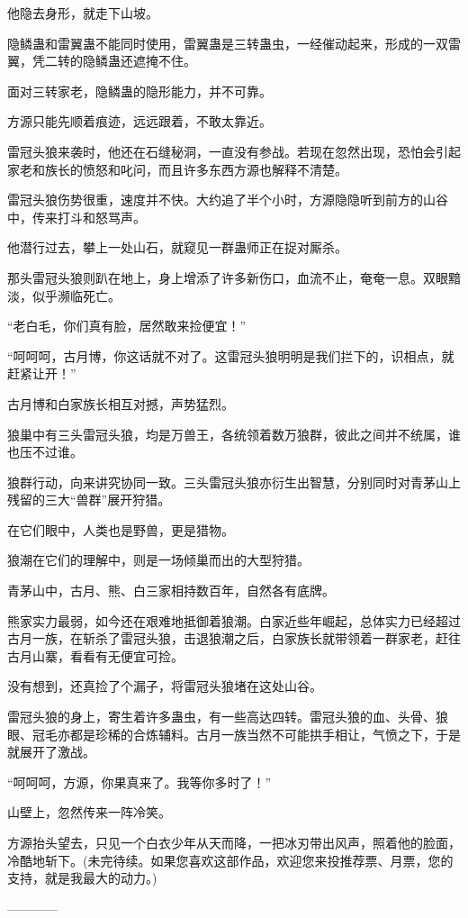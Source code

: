 \begin{this_body}
他隐去身形，就走下山坡。

隐鳞蛊和雷翼蛊不能同时使用，雷翼蛊是三转蛊虫，一经催动起来，形成的一双雷翼，凭二转的隐鳞蛊还遮掩不住。

面对三转家老，隐鳞蛊的隐形能力，并不可靠。

方源只能先顺着痕迹，远远跟着，不敢太靠近。

雷冠头狼来袭时，他还在石缝秘洞，一直没有参战。若现在忽然出现，恐怕会引起家老和族长的愤怒和叱问，而且许多东西方源也解释不清楚。

雷冠头狼伤势很重，速度并不快。大约追了半个小时，方源隐隐听到前方的山谷中，传来打斗和怒骂声。

他潜行过去，攀上一处山石，就窥见一群蛊师正在捉对厮杀。

那头雷冠头狼则趴在地上，身上增添了许多新伤口，血流不止，奄奄一息。双眼黯淡，似乎濒临死亡。

“老白毛，你们真有脸，居然敢来捡便宜！”

“呵呵呵，古月博，你这话就不对了。这雷冠头狼明明是我们拦下的，识相点，就赶紧让开！”

古月博和白家族长相互对撼，声势猛烈。

狼巢中有三头雷冠头狼，均是万兽王，各统领着数万狼群，彼此之间并不统属，谁也压不过谁。

狼群行动，向来讲究协同一致。三头雷冠头狼亦衍生出智慧，分别同时对青茅山上残留的三大“兽群”展开狩猎。

在它们眼中，人类也是野兽，更是猎物。

狼潮在它们的理解中，则是一场倾巢而出的大型狩猎。

青茅山中，古月、熊、白三家相持数百年，自然各有底牌。

熊家实力最弱，如今还在艰难地抵御着狼潮。白家近些年崛起，总体实力已经超过古月一族，在斩杀了雷冠头狼，击退狼潮之后，白家族长就带领着一群家老，赶往古月山寨，看看有无便宜可捡。

没有想到，还真捡了个漏子，将雷冠头狼堵在这处山谷。

雷冠头狼的身上，寄生着许多蛊虫，有一些高达四转。雷冠头狼的血、头骨、狼眼、冠毛亦都是珍稀的合炼辅料。古月一族当然不可能拱手相让，气愤之下，于是就展开了激战。

“呵呵呵，方源，你果真来了。我等你多时了！”

山壁上，忽然传来一阵冷笑。

方源抬头望去，只见一个白衣少年从天而降，一把冰刃带出风声，照着他的脸面，冷酷地斩下。(未完待续。如果您喜欢这部作品，欢迎您来投推荐票、月票，您的支持，就是我最大的动力。)

------------

\end{this_body}

